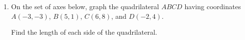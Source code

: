 \documentclass[12pt, twoside]{article}
\begin{document}
\begin{enumerate}
    \newpage

      \item On the set of axes below, graph the quadrilateral $ABCD$ having coordinates $A(-3,-3)$, $B(5,1)$, $C(6,8)$, and $D(-2,4)$.
        \begin{center} %
        \end{center}
        Find the length of each side of the quadrilateral.


  \end{enumerate}
\end{document}
